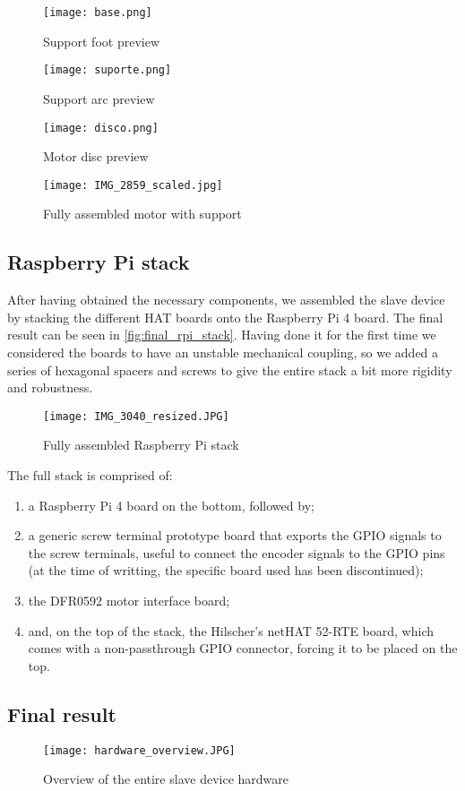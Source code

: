 \begin{figure}[htp]
	\centering
	\texttt{[image: base.png]}
	\caption{Support foot preview}
	\label{fig:support_base}
\end{figure}
\begin{figure}[htp]
	\centering
	\texttt{[image: suporte.png]}
	\caption{Support arc preview}
	\label{fig:support_arc}
\end{figure}
\begin{figure}[htp]
	\centering
	\texttt{[image: disco.png]}
	\caption{Motor disc preview}
	\label{fig:support_disc}
\end{figure}
\begin{figure}[htp]
	\centering
	\texttt{[image: IMG\_2859\_scaled.jpg]}
	\caption{Fully assembled motor with support}
	\label{fig:final_motor_stage}
\end{figure}

\subsection{Raspberry Pi stack}

After having obtained the necessary components, we assembled the slave device by stacking the different HAT boards onto the Raspberry Pi 4 board.
The final result can be seen in \autoref{fig:final_rpi_stack}.
Having done it for the first time we considered the boards to have an unstable mechanical coupling, so we added a series of hexagonal spacers and screws to give the entire stack a bit more rigidity and robustness.

\begin{figure}[htp]
	\centering
	\texttt{[image: IMG\_3040\_resized.JPG]}
	\caption{Fully assembled Raspberry Pi stack}
	\label{fig:final_rpi_stack}
\end{figure}

The full stack is comprised of:
\begin{enumerate}
	\item a Raspberry Pi 4 board \cite{product:rpi4} on the bottom, followed by;
	\item a generic screw terminal prototype board that exports the GPIO signals to the screw terminals, useful to connect the encoder signals to the GPIO pins (at the time of writting, the specific board used has been discontinued);
	\item the DFR0592 motor interface board;
	\item and, on the top of the stack, the Hilscher's netHAT 52-RTE board, which comes with a non-passthrough GPIO connector, forcing it to be placed on the top.
\end{enumerate}

\subsection*{Final result}

\begin{figure}[htp]
	\centering
	\texttt{[image: hardware\_overview.JPG]}
	\caption{Overview of the entire slave device hardware}
	\label{fig:hardware_overview}
\end{figure}

